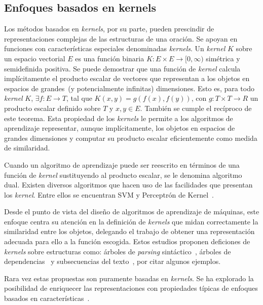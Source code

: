 \subsection{Enfoques basados en kernels}

Los métodos basados en \textit{kernels}, por su parte, pueden prescindir de representaciones complejas de las estructuras de una oración. 
Se apoyan en funciones con características especiales denominadas \textit{kernels}.
Un \textit{kernel} $K$ sobre un espacio vectorial $E$ es una función binaria $K:E\times E\rightarrow [0,\infty)$ simétrica y semidefinida positiva.
Se puede demostrar que una función de \textit{kernel} calcula implícitamente el producto escalar de vectores que representan a los objetos en espacios de grandes~(y potencialmente infinitas) dimensiones.
Esto es, para todo \textit{kernel} $K$, $\exists f:E\rightarrow T$, tal que $K(x,y)=g(f(x),f(y))$, con $g:T\times T \rightarrow R$ un producto escalar definido sobre $T$ y $x,y\in E$. También se cumple el recíproco de este teorema.
Esta propiedad de los \textit{kernels} le permite a los algoritmos de aprendizaje representar, aunque implícitamente, los objetos en espacios de grandes dimensiones y computar su producto escalar eficientemente como medida de similaridad.

Cuando un algoritmo de aprendizaje puede ser reescrito en términos de una función de \textit{kernel} sustituyendo al producto escalar, se le denomina algoritmo dual.
Existen diversos algoritmos que hacen uso de las facilidades que presentan los \textit{kernel}.
Entre ellos se encuentran SVM y Perceptrón de Kernel~\cite{aizerman1964theoretical}.

Desde el punto de vista del diseño de algoritmos de aprendizaje de máquinas, este enfoque centra su atención en la definición de \textit{kernels} que midan correctamente la similaridad entre los objetos, delegando el trabajo de obtener una representación adecuada para ello a la función escogida.
Estos estudios proponen deficiones de \textit{kernels} sobre estructuras como: árboles de \textit{parsing} sintáctico~\cite{zelenko2003kernel, zhao2005extracting, zhang2006composite, zhou2007tree}, árboles de dependencias~\cite{culotta2004dependency, bunescu2005shortest, zhao2005extracting} y subsecuencias del texto~\cite{zhao2005extracting, mooney2006subsequence}, por citar algunos ejemplos.

Rara vez estas propuestas son puramente basadas en \textit{kernels}.
Se ha explorado la posibilidad de enriquecer las representaciones con propiedades típicas de enfoques basados en características~\cite{culotta2004dependency, bunescu2005shortest, zhang2006composite, zhao2005extracting}.

